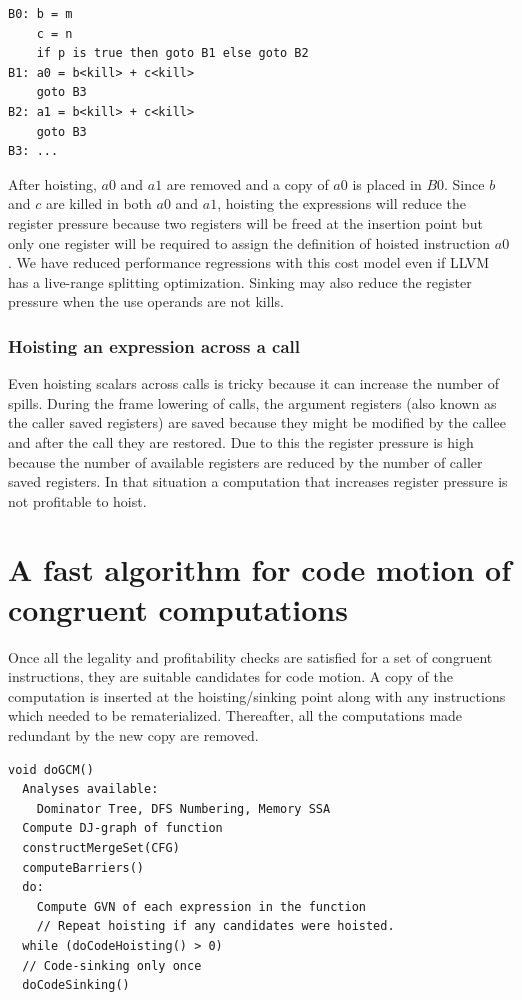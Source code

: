 \documentclass[sigplan,10pt,review,anonymous]{acmart}\settopmatter{printfolios=true,printccs=false,printacmref=false}
\begin{document}
\begin{lstlisting}
B0: b = m
    c = n
    if p is true then goto B1 else goto B2
B1: a0 = b<kill> + c<kill>
    goto B3
B2: a1 = b<kill> + c<kill>
    goto B3
B3: ...
\end{lstlisting}

After hoisting, $a0$ and $a1$ are removed and a copy of $a0$ is placed in
$B0$. Since $b$ and $c$ are killed in both $a0$ and $a1$, hoisting the
expressions will reduce the register pressure because two registers will be
freed at the insertion point but only one register will be required to assign
the definition of hoisted instruction $a0$. We have reduced performance
regressions with this cost model even if LLVM has a live-range splitting
\cite{cooper1998live} optimization. Sinking may also reduce the register
pressure when the use operands are not kills.

\subsubsection{Hoisting an expression across a call}
\label{cost:across-calls}
Even hoisting scalars across calls is tricky because it can increase the number
of spills. During the frame lowering of calls, the argument registers (also
known as the caller saved registers) are saved because they might be modified by
the callee and after the call they are restored. Due to this the register
pressure is high because the number of available registers are reduced by the
number of caller saved registers. In that situation a computation that increases
register pressure is not profitable to hoist.

\section{A fast algorithm for code motion of congruent computations}
\label{subsec:optimistic}
Once all the legality and profitability checks are satisfied for a set of
congruent instructions, they are suitable candidates for code motion. A
copy of the computation is inserted at the hoisting/sinking point along with any
instructions which needed to be rematerialized. Thereafter, all the computations
made redundant by the new copy are removed.


\begin{lstlisting}
void doGCM()
  Analyses available:
    Dominator Tree, DFS Numbering, Memory SSA
  Compute DJ-graph of function
  constructMergeSet(CFG)
  computeBarriers()
  do:
    Compute GVN of each expression in the function
    // Repeat hoisting if any candidates were hoisted.
  while (doCodeHoisting() > 0)
  // Code-sinking only once
  doCodeSinking()
\end{lstlisting}
\end{document}
